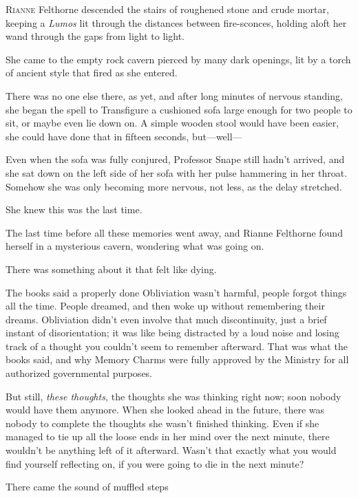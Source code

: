 

\lettrine{R}{ianne} Felthorne
descended the stairs of roughened stone and crude mortar, keeping a
\emph{Lumos} lit through the distances between fire-sconces, holding aloft her
wand through the gaps from light to light.

She came to the empty rock cavern pierced by many dark openings, lit by a torch
of ancient style that fired as she entered.

There was no one else there, as yet, and after long minutes of nervous
standing, she began the spell to Transfigure a cushioned sofa large enough for
two people to sit, or maybe even lie down on. A simple wooden stool would have
been easier, she could have done that in fifteen seconds, but---well---

Even when the sofa was fully conjured, Professor Snape still hadn't arrived,
and she sat down on the left side of her sofa with her pulse hammering in her
throat. Somehow she was only becoming more nervous, not less, as the delay
stretched.

She knew this was the last time.

The last time before all these memories went away, and Rianne Felthorne found
herself in a mysterious cavern, wondering what was going on.

There was something about it that felt like dying.

The books said a properly done Obliviation wasn't harmful, people forgot things
all the time. People dreamed, and then woke up without remembering their
dreams. Obliviation didn't even involve that much discontinuity, just a brief
instant of disorientation; it was like being distracted by a loud noise and
losing track of a thought you couldn't seem to remember afterward. That was
what the books said, and why Memory Charms were fully approved by the Ministry
for all authorized governmental purposes.

But still, \emph{these thoughts,} the thoughts she was thinking right now; soon
nobody would have them anymore. When she looked ahead in the future, there was
nobody to complete the thoughts she wasn't finished thinking. Even if she
managed to tie up all the loose ends in her mind over the next minute, there
wouldn't be anything left of it afterward. Wasn't that exactly what you would
find yourself reflecting on, if you were going to die in the next minute?

There came the sound of muffled steps{\el}

